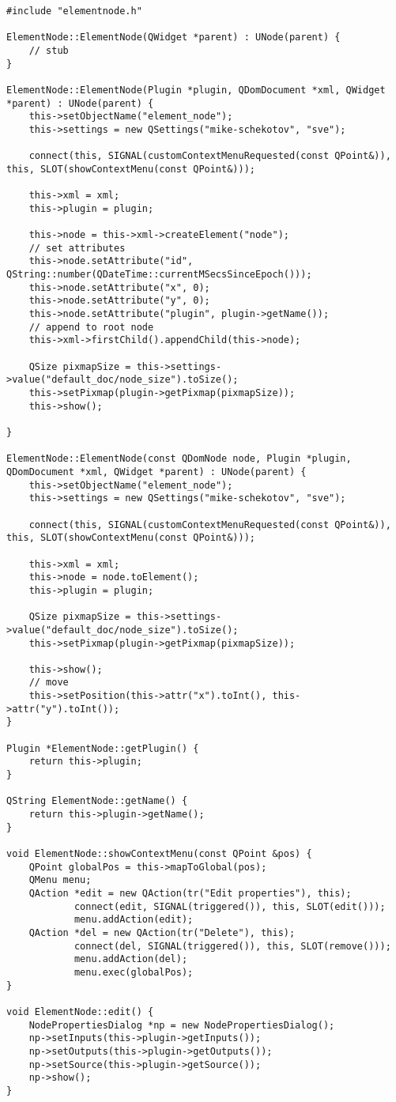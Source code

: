 \begin{lstlisting}
#include "elementnode.h"

ElementNode::ElementNode(QWidget *parent) : UNode(parent) {
    // stub
}

ElementNode::ElementNode(Plugin *plugin, QDomDocument *xml, QWidget *parent) : UNode(parent) {
    this->setObjectName("element_node");
    this->settings = new QSettings("mike-schekotov", "sve");

    connect(this, SIGNAL(customContextMenuRequested(const QPoint&)), this, SLOT(showContextMenu(const QPoint&)));

    this->xml = xml;
    this->plugin = plugin;

    this->node = this->xml->createElement("node");
    // set attributes
    this->node.setAttribute("id", QString::number(QDateTime::currentMSecsSinceEpoch()));
    this->node.setAttribute("x", 0);
    this->node.setAttribute("y", 0);
    this->node.setAttribute("plugin", plugin->getName());
    // append to root node
    this->xml->firstChild().appendChild(this->node);

    QSize pixmapSize = this->settings->value("default_doc/node_size").toSize();
    this->setPixmap(plugin->getPixmap(pixmapSize));
    this->show();

}

ElementNode::ElementNode(const QDomNode node, Plugin *plugin, QDomDocument *xml, QWidget *parent) : UNode(parent) {
    this->setObjectName("element_node");
    this->settings = new QSettings("mike-schekotov", "sve");

    connect(this, SIGNAL(customContextMenuRequested(const QPoint&)), this, SLOT(showContextMenu(const QPoint&)));

    this->xml = xml;
    this->node = node.toElement();
    this->plugin = plugin;

    QSize pixmapSize = this->settings->value("default_doc/node_size").toSize();
    this->setPixmap(plugin->getPixmap(pixmapSize));

    this->show();
    // move
    this->setPosition(this->attr("x").toInt(), this->attr("y").toInt());
}

Plugin *ElementNode::getPlugin() {
    return this->plugin;
}

QString ElementNode::getName() {
    return this->plugin->getName();
}

void ElementNode::showContextMenu(const QPoint &pos) {
    QPoint globalPos = this->mapToGlobal(pos);
    QMenu menu;
    QAction *edit = new QAction(tr("Edit properties"), this);
            connect(edit, SIGNAL(triggered()), this, SLOT(edit()));
            menu.addAction(edit);
    QAction *del = new QAction(tr("Delete"), this);
            connect(del, SIGNAL(triggered()), this, SLOT(remove()));
            menu.addAction(del);
            menu.exec(globalPos);
}

void ElementNode::edit() {
    NodePropertiesDialog *np = new NodePropertiesDialog();
    np->setInputs(this->plugin->getInputs());
    np->setOutputs(this->plugin->getOutputs());
    np->setSource(this->plugin->getSource());
    np->show();
}
\end{lstlisting}~\\

